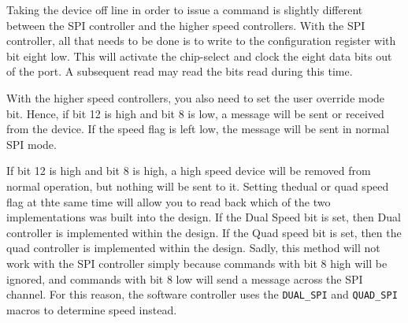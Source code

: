 \documentclass{gqtekspec}
\begin{document}
Taking the device off line in order to issue a command is slightly different
between the SPI controller and the higher speed controllers.  With the
SPI controller, all that needs to be done is to write to the configuration
register with bit eight low.  This will activate the chip-select and clock
the eight data bits out of the port.  A subsequent read may read the bits
read during this time.

With the higher speed controllers, you also need to set the user override
mode bit.  Hence, if bit 12 is high and bit 8 is low, a message will be
sent or received from the device.  If the speed flag is left low, the
message will be sent in normal SPI mode.
	
If bit 12 is high and bit 8 is high, a high speed device will be removed
from normal operation, but nothing will be sent to it.  Setting thedual or
quad speed flag at thte same time will allow you to read back which of the
two implementations was built into the design.  If the Dual Speed bit is set,
then Dual controller is implemented within the design.  If the Quad speed bit
is set, then the quad controller is implemented within the design.  Sadly,
this method will not work with the SPI controller simply because commands with
bit 8 high will be ignored, and commands with bit 8 low will send a message
across the SPI channel.  For this reason, the software controller
uses the {\tt DUAL_SPI} and {\tt QUAD_SPI} macros to determine speed
instead.
\end{document}
